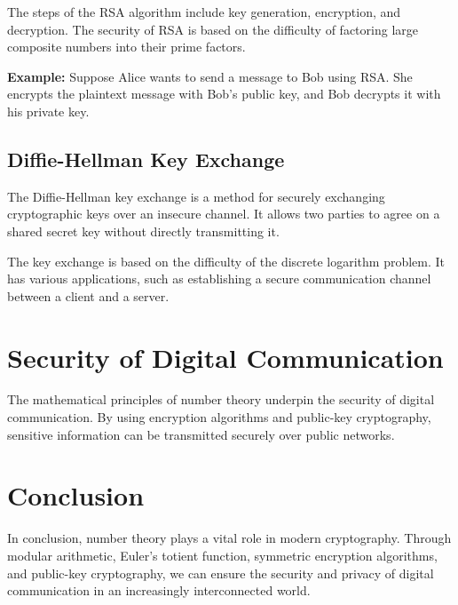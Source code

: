\documentclass{article}
\begin{document}
The steps of the RSA algorithm include key generation, encryption, and decryption. The security of RSA is based on the difficulty of factoring large composite numbers into their prime factors.

\textbf{Example:} Suppose Alice wants to send a message to Bob using RSA. She encrypts the plaintext message with Bob's public key, and Bob decrypts it with his private key.

\subsection{Diffie-Hellman Key Exchange}
The Diffie-Hellman key exchange is a method for securely exchanging cryptographic keys over an insecure channel. It allows two parties to agree on a shared secret key without directly transmitting it.

The key exchange is based on the difficulty of the discrete logarithm problem. It has various applications, such as establishing a secure communication channel between a client and a server.

\section{Security of Digital Communication}
The mathematical principles of number theory underpin the security of digital communication. By using encryption algorithms and public-key cryptography, sensitive information can be transmitted securely over public networks.

\section{Conclusion}
In conclusion, number theory plays a vital role in modern cryptography. Through modular arithmetic, Euler's totient function, symmetric encryption algorithms, and public-key cryptography, we can ensure the security and privacy of digital communication in an increasingly interconnected world.
\end{document}
